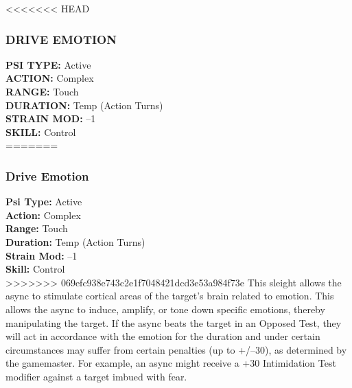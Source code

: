 <<<<<<< HEAD \subsubsection{DRIVE EMOTION} \textbf{PSI TYPE:} Active \\ \textbf{ACTION:} Complex \\ \textbf{RANGE:} Touch \\ \textbf{DURATION:} Temp (Action Turns) \\ \textbf{STRAIN MOD:} –1 \\ \textbf{SKILL:} Control\\ ======= \subsubsection{Drive Emotion} \textbf{Psi Type:} Active \\ \textbf{Action:} Complex \\ \textbf{Range:} Touch \\ \textbf{Duration:} Temp (Action Turns) \\ \textbf{Strain Mod:} –1 \\ \textbf{Skill:} Control\\ >>>>>>> 069efc938e743c2e1f7048421dcd3e53a984f73e This sleight allows the async to stimulate cortical areas of the target’s brain related to emotion. This allows the async to induce, amplify, or tone down specific emotions, thereby manipulating the target. If the async beats the target in an Opposed Test, they will act in accordance with the emotion for the duration and under certain circumstances may suffer from certain penalties (up to +/–30), as determined by the gamemaster. For example, an async might receive a +30 Intimidation Test modifier against a target imbued with fear. 

